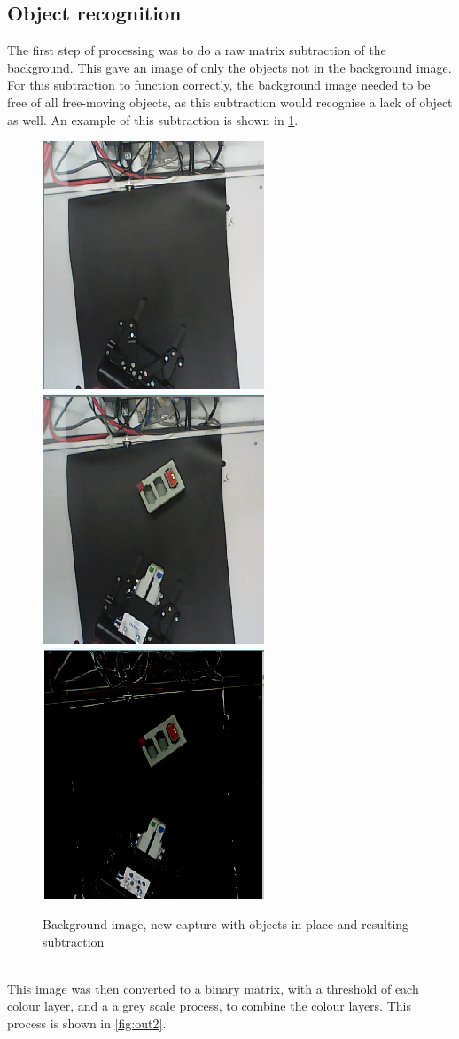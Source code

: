 \documentclass[11pt,a4paper]{report}
\begin{document}
\subsection{Object recognition}
The first step of processing was to do a raw matrix subtraction of the background. This gave an image of only the objects not in the background image. For this subtraction to function correctly, the background image needed to be free of all free-moving objects, as this subtraction would recognise a lack of object as well. An example of this subtraction is shown in \cref{fig:backgrond}.
\begin{figure}
	\centering
	\includegraphics[width=0.3\linewidth]{backgrond} %
		\includegraphics[width=0.3\linewidth]{base} %
			\includegraphics[width=0.3\linewidth]{diff}
	\caption{ Background image, new capture with objects in place and resulting subtraction }
	\label{fig:backgrond}
\end{figure}\ \\
This image was then converted to a binary matrix, with a threshold of each colour layer, and a a grey scale process, to combine the colour layers. This process is shown in \cref{fig:out2}.\\ 
\end{document}
